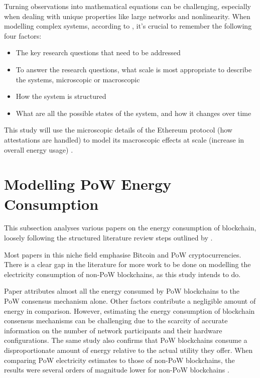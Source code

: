 Turning observations into mathematical equations can be challenging, especially when dealing with unique properties like large networks and nonlinearity. When modelling complex systems, according to \cite{SayamaINTRODUCTIONSYSTEMS}, it's crucial to remember the following four factors:

\begin{itemize}
    \item The key research questions that need to be addressed
    \item To answer the research questions, what scale is most appropriate to describe the systems, microscopic or macroscopic
    \item How the system is structured
    \item What are all the possible states of the system, and how it changes over time
\end{itemize}

This study will use the microscopic details of the Ethereum protocol (how attestations are handled) to model its macroscopic effects at scale (increase in overall energy usage) \cite{MarionAnModelling}. 







\section{Modelling PoW Energy Consumption}

This subsection analyses various papers on the energy consumption of blockchain, loosely following the structured literature review steps outlined by \cite{Crosby2015BlockChainBitcoin}.

Most papers in this niche field emphasise Bitcoin and PoW cryptocurrencies. There is a clear gap in the literature for more work to be done on modelling the electricity consumption of non-PoW blockchains, as this study intends to do.

Paper \cite{Sedlmeir2020TheMyth} attributes almost all the energy consumed by PoW blockchains to the PoW consensus mechanism alone. Other factors contribute a negligible amount of energy in comparison. However, estimating the energy consumption of blockchain consensus mechanisms can be challenging due to the scarcity of accurate information on the number of network participants and their hardware configurations. The same study also confirms that PoW blockchains consume a disproportionate amount of energy relative to the actual utility they offer. When comparing PoW electricity estimates to those of non-PoW blockchains, the results were several orders of magnitude lower for non-PoW blockchains \cite{Sedlmeir2020TheMyth}. 

